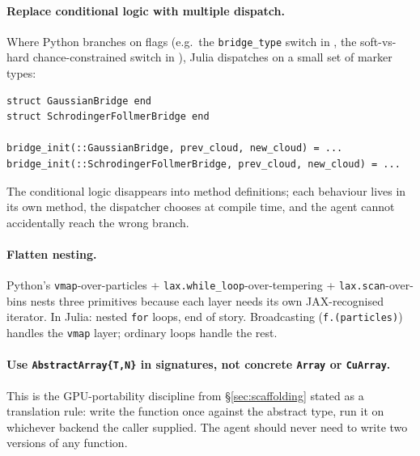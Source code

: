 \documentclass[11pt,a4paper]{article}
\begin{document}
\paragraph{Replace conditional logic with multiple dispatch.}
Where Python branches on flags (e.g.\ the \texttt{bridge\_type}
switch in , the soft-vs-hard
chance-constrained switch in ), Julia
dispatches on a small set of marker types:
\begin{lstlisting}
struct GaussianBridge end
struct SchrodingerFollmerBridge end

bridge_init(::GaussianBridge, prev_cloud, new_cloud) = ...
bridge_init(::SchrodingerFollmerBridge, prev_cloud, new_cloud) = ...
\end{lstlisting}
The conditional logic disappears into method definitions; each
behaviour lives in its own method, the dispatcher chooses at
compile time, and the agent cannot accidentally reach the wrong
branch.

\paragraph{Flatten nesting.} Python's \texttt{vmap}-over-particles
+ \texttt{lax.while\_loop}-over-tempering +
\texttt{lax.scan}-over-bins nests three primitives because each
layer needs its own JAX-recognised iterator. In Julia: nested
\texttt{for} loops, end of story. Broadcasting
(\texttt{f.(particles)}) handles the \texttt{vmap} layer; ordinary
loops handle the rest.

\paragraph{Use \texttt{AbstractArray\{T,N\}} in signatures, not
concrete \texttt{Array} or \texttt{CuArray}.} This is the
GPU-portability discipline from §\ref{sec:scaffolding} stated as a
translation rule: write the function once against the abstract
type, run it on whichever backend the caller supplied. The agent
should never need to write two versions of any function.
\end{document}
